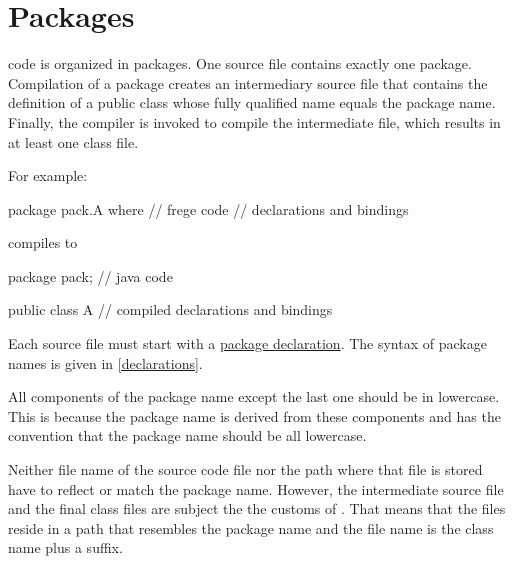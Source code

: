 %
%
%
%
%
%
%


\chapter{Packages} \label{packages} 

\frege{} code is organized in packages. One source file contains
exactly one package. Compilation of a package creates an  intermediary \java{}
source file that contains the definition of a public class whose fully qualified name equals the \frege{} package name. Finally, the \java{} compiler is invoked to compile the intermediate file, which results in at least one class file.

For example:

\begin{code}
package pack.A where  // frege code
// declarations and bindings
\end{code}

compiles to

\begin{code}
package pack;        // java code

public class A {
    // compiled declarations and bindings
}
\end{code}


Each source file must start with a \hyperref[packagedcl]{package declaration}.
The syntax of package names is given in \autoref{declarations}.

All components of the package name
except the last one should be in lowercase. This is because the \java{}
package name is derived from these components and \java{} has the
convention that the package name should be all lowercase.

Neither file name of the \frege{} source code file nor the path where that file is stored have to reflect or match the package name. However, the intermediate \java{} source file and the final class files are subject the the customs of \java{}. That means that the files reside in a path that resembles the package name and the file name is the class name plus a suffix.

